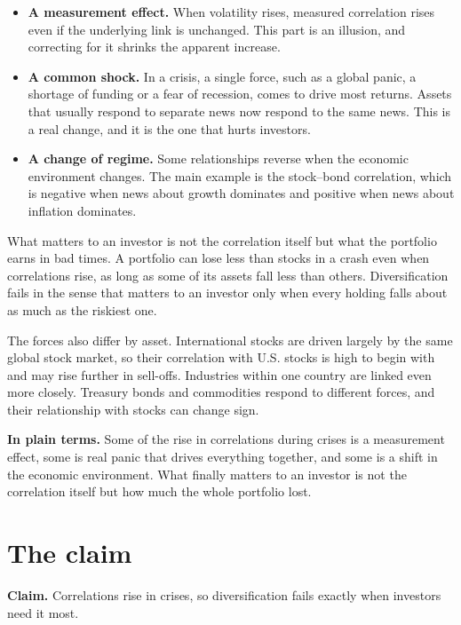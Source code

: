 \begin{itemize}
  \item \textbf{A measurement effect.} When volatility rises, measured correlation rises even if the underlying link is unchanged. This part is an illusion, and correcting for it shrinks the apparent increase.
  \item \textbf{A common shock.} In a crisis, a single force, such as a global panic, a shortage of funding or a fear of recession, comes to drive most returns. Assets that usually respond to separate news now respond to the same news. This is a real change, and it is the one that hurts investors.
  \item \textbf{A change of regime.} Some relationships reverse when the economic environment changes. The main example is the stock--bond correlation, which is negative when news about growth dominates and positive when news about inflation dominates.
\end{itemize}

What matters to an investor is not the correlation itself but what the portfolio earns in bad times. A portfolio can lose less than stocks in a crash even when correlations rise, as long as some of its assets fall less than others. Diversification fails in the sense that matters to an investor only when every holding falls about as much as the riskiest one.

The forces also differ by asset. International stocks are driven largely by the same global stock market, so their correlation with U.S. stocks is high to begin with and may rise further in sell-offs. Industries within one country are linked even more closely. Treasury bonds and commodities respond to different forces, and their relationship with stocks can change sign.

\noindent\textbf{In plain terms.} Some of the rise in correlations during crises is a measurement effect, some is real panic that drives everything together, and some is a shift in the economic environment. What finally matters to an investor is not the correlation itself but how much the whole portfolio lost.

\section{The claim}
\label{sec:13-claim}

\begin{callout}
\textbf{Claim.} Correlations rise in crises, so diversification fails exactly when investors need it most.
\end{callout}

